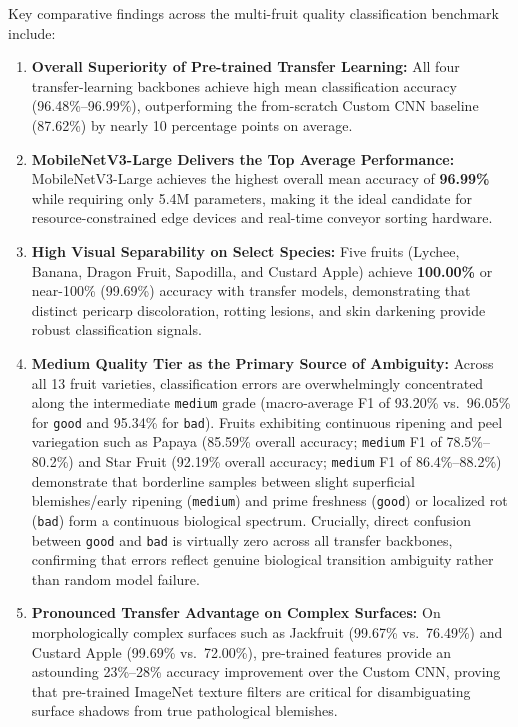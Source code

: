 \documentclass[11pt,a4paper]{article}
\begin{document}
Key comparative findings across the multi-fruit quality classification benchmark include:
\begin{enumerate}
    \item \textbf{Overall Superiority of Pre-trained Transfer Learning:} All four transfer-learning backbones achieve high mean classification accuracy (96.48\%--96.99\%), outperforming the from-scratch Custom CNN baseline (87.62\%) by nearly 10 percentage points on average.
    \item \textbf{MobileNetV3-Large Delivers the Top Average Performance:} MobileNetV3-Large achieves the highest overall mean accuracy of \textbf{96.99\%} while requiring only 5.4M parameters, making it the ideal candidate for resource-constrained edge devices and real-time conveyor sorting hardware.
    \item \textbf{High Visual Separability on Select Species:} Five fruits (Lychee, Banana, Dragon Fruit, Sapodilla, and Custard Apple) achieve \textbf{100.00\%} or near-100\% (99.69\%) accuracy with transfer models, demonstrating that distinct pericarp discoloration, rotting lesions, and skin darkening provide robust classification signals.
    \item \textbf{Medium Quality Tier as the Primary Source of Ambiguity:} Across all 13 fruit varieties, classification errors are overwhelmingly concentrated along the intermediate \texttt{medium} grade (macro-average F1 of 93.20\% vs.\ 96.05\% for \texttt{good} and 95.34\% for \texttt{bad}). Fruits exhibiting continuous ripening and peel variegation such as Papaya (85.59\% overall accuracy; \texttt{medium} F1 of 78.5\%--80.2\%) and Star Fruit (92.19\% overall accuracy; \texttt{medium} F1 of 86.4\%--88.2\%) demonstrate that borderline samples between slight superficial blemishes/early ripening (\texttt{medium}) and prime freshness (\texttt{good}) or localized rot (\texttt{bad}) form a continuous biological spectrum. Crucially, direct confusion between \texttt{good} and \texttt{bad} is virtually zero across all transfer backbones, confirming that errors reflect genuine biological transition ambiguity rather than random model failure.
    \item \textbf{Pronounced Transfer Advantage on Complex Surfaces:} On morphologically complex surfaces such as Jackfruit (99.67\% vs.\ 76.49\%) and Custard Apple (99.69\% vs.\ 72.00\%), pre-trained features provide an astounding 23\%--28\% accuracy improvement over the Custom CNN, proving that pre-trained ImageNet texture filters are critical for disambiguating surface shadows from true pathological blemishes.
\end{enumerate}
\end{document}

